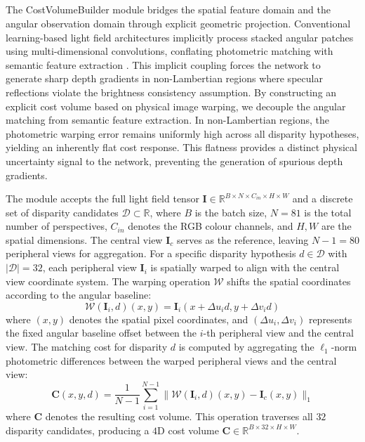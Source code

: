 \documentclass[lettersize,journal]{IEEEtran}
\begin{document}
\subsection{}

The CostVolumeBuilder module bridges the spatial feature domain and the angular observation domain through explicit geometric projection. Conventional learning-based light field architectures implicitly process stacked angular patches using multi-dimensional convolutions, conflating photometric matching with semantic feature extraction \cite{heber2018}. This implicit coupling forces the network to generate sharp depth gradients in non-Lambertian regions where specular reflections violate the brightness consistency assumption. By constructing an explicit cost volume based on physical image warping, we decouple the angular matching from semantic feature extraction. In non-Lambertian regions, the photometric warping error remains uniformly high across all disparity hypotheses, yielding an inherently flat cost response. This flatness provides a distinct physical uncertainty signal to the network, preventing the generation of spurious depth gradients.

The module accepts the full light field tensor $\mathbf{I} \in \mathbb{R}^{B \times N \times C_{in} \times H \times W}$ and a discrete set of disparity candidates $\mathcal{D} \subset \mathbb{R}$, where $B$ is the batch size, $N=81$ is the total number of perspectives, $C_{in}$ denotes the RGB colour channels, and $H, W$ are the spatial dimensions. The central view $\mathbf{I}_c$ serves as the reference, leaving $N-1=80$ peripheral views for aggregation. For a specific disparity hypothesis $d \in \mathcal{D}$ with $|\mathcal{D}|=32$, each peripheral view $\mathbf{I}_i$ is spatially warped to align with the central view coordinate system. The warping operation $\mathcal{W}$ shifts the spatial coordinates according to the angular baseline:
\begin{equation}
\mathcal{W}(\mathbf{I}_i, d)(x,y) = \mathbf{I}_i(x + \Delta u_i d, y + \Delta v_i d)
\end{equation}
where $(x,y)$ denotes the spatial pixel coordinates, and $(\Delta u_i, \Delta v_i)$ represents the fixed angular baseline offset between the $i$-th peripheral view and the central view. The matching cost for disparity $d$ is computed by aggregating the $\ell_1$-norm photometric differences between the warped peripheral views and the central view:
\begin{equation}
\mathbf{C}(x,y,d) = \frac{1}{N-1} \sum_{i=1}^{N-1} \| \mathcal{W}(\mathbf{I}_i, d)(x,y) - \mathbf{I}_c(x,y) \|_1
\end{equation}
where $\mathbf{C}$ denotes the resulting cost volume. This operation traverses all $32$ disparity candidates, producing a $4\text{D}$ cost volume $\mathbf{C} \in \mathbb{R}^{B \times 32 \times H \times W}$. 
\end{document}
